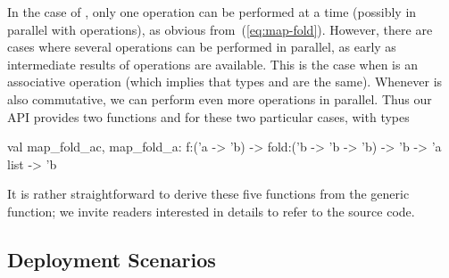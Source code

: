 \documentclass{llncs}
\begin{document}
In the case of , only one  operation can
be performed at a time (possibly in parallel with 
operations), as obvious from~(\ref{eq:map-fold}). However, there are
cases where several  operations can be performed in parallel,
as early as intermediate results of  operations are available.
This is the case when  is an associative operation (which
implies that types  and  are the same).
Whenever
 is also commutative, we can perform even more 
operations in parallel. Thus our API provides two functions
 and  for these two particular cases,
with types
\begin{ocaml}
  val map_fold_ac, map_fold_a: 
    f:('a -> 'b) -> fold:('b -> 'b -> 'b) -> 'b -> 'a list -> 'b 
\end{ocaml}
It is rather straightforward to derive these five functions from the
generic  function; we invite readers interested in details to
refer to the source code.

\subsection{Deployment Scenarios}
\end{document}
